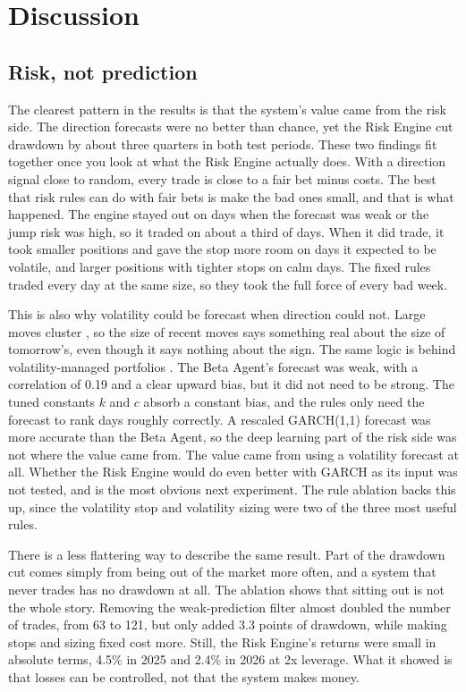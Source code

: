 \section{Discussion}\label{sec:discussion}

\subsection{Risk, not prediction}

The clearest pattern in the results is that the system's value came from the risk side. The direction forecasts were no better than chance, yet the Risk Engine cut drawdown by about three quarters in both test periods. These two findings fit together once you look at what the Risk Engine actually does. With a direction signal close to random, every trade is close to a fair bet minus costs. The best that risk rules can do with fair bets is make the bad ones small, and that is what happened. The engine stayed out on days when the forecast was weak or the jump risk was high, so it traded on about a third of days. When it did trade, it took smaller positions and gave the stop more room on days it expected to be volatile, and larger positions with tighter stops on calm days. The fixed rules traded every day at the same size, so they took the full force of every bad week.

This is also why volatility could be forecast when direction could not. Large moves cluster \cite{cont2001}, so the size of recent moves says something real about the size of tomorrow's, even though it says nothing about the sign. The same logic is behind volatility-managed portfolios \cite{moreira2017}. The Beta Agent's forecast was weak, with a correlation of 0.19 and a clear upward bias, but it did not need to be strong. The tuned constants $k$ and $c$ absorb a constant bias, and the rules only need the forecast to rank days roughly correctly. A rescaled GARCH(1,1) forecast was more accurate than the Beta Agent, so the deep learning part of the risk side was not where the value came from. The value came from using a volatility forecast at all. Whether the Risk Engine would do even better with GARCH as its input was not tested, and is the most obvious next experiment. The rule ablation backs this up, since the volatility stop and volatility sizing were two of the three most useful rules.

There is a less flattering way to describe the same result. Part of the drawdown cut comes simply from being out of the market more often, and a system that never trades has no drawdown at all. The ablation shows that sitting out is not the whole story. Removing the weak-prediction filter almost doubled the number of trades, from 63 to 121, but only added 3.3 points of drawdown, while making stops and sizing fixed cost more. Still, the Risk Engine's returns were small in absolute terms, 4.5\% in 2025 and 2.4\% in 2026 at 2x leverage. What it showed is that losses can be controlled, not that the system makes money.

